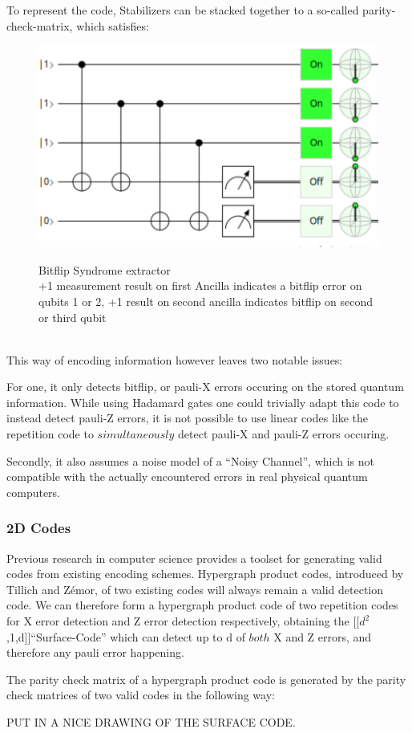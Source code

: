 To represent the code, Stabilizers can be stacked together to
a so-called parity-check-matrix, which satisfies:
\newpage
\begin{figure}
	\begin{center}
\includegraphics[scale=0.2]{./img/bitflipSyndromeExtraction3Rep.png}\\
	\caption{Bitflip Syndrome extractor\\
        +1 measurement result on first Ancilla indicates a bitflip error
        on qubits 1 or 2, +1 result on second ancilla indicates 
        bitflip on second or third qubit}
	\label{fig: syndrome extractor}
	\end{center}
\end{figure}
\\

This way of encoding information however leaves two notable
issues:

For one, it only detects bitflip, or pauli-X errors occuring on
the stored quantum information. While using Hadamard gates one
could trivially adapt this code to instead detect pauli-Z errors,
it is not possible to use linear codes like the repetition code
to $simultaneously$ detect pauli-X and pauli-Z errors occuring.

Secondly, it also assumes a noise model of a ``Noisy Channel'',
which is not compatible with the actually encountered errors in
real physical quantum computers.

\subsubsection{2D Codes}
Previous research in computer science 
provides a toolset for generating valid codes
from existing encoding schemes. 
Hypergraph product codes, introduced by Tillich and Z\'emor,
of two 
existing codes will always remain a valid detection code.
We can therefore form a hypergraph product code of two repetition
codes for X error detection and Z error detection respectively,
obtaining the [[$d^2$,1,d]]``Surface-Code'' which can detect up
to d of $both$ X and Z errors, and 
therefore any pauli error happening.

The parity check matrix of a hypergraph product code is generated
by the parity check matrices of two valid codes in the following
way:



PUT IN A NICE DRAWING OF THE SURFACE CODE.
